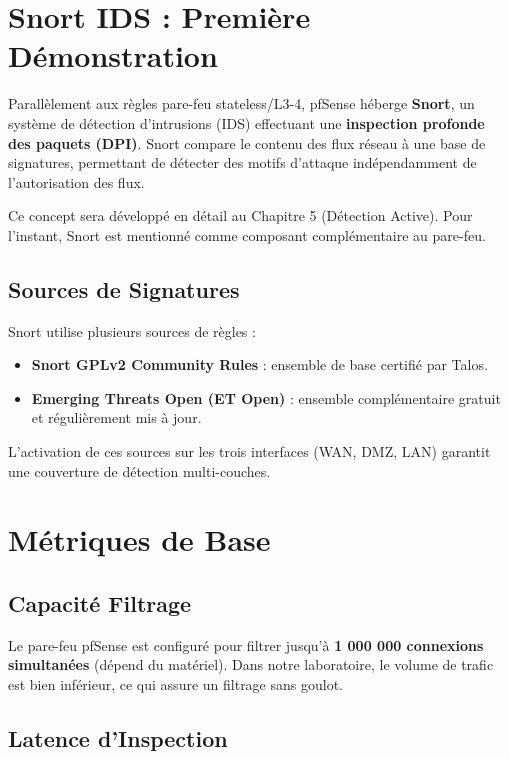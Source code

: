 \documentclass[12pt,a4paper,openany]{report}
\begin{document}
\section{Snort IDS : Première Démonstration}

Parallèlement aux règles pare-feu stateless/L3-4, pfSense héberge \textbf{Snort}, un système de détection d'intrusions (IDS) effectuant une \textbf{inspection profonde des paquets (DPI)}. Snort compare le contenu des flux réseau à une base de signatures, permettant de détecter des motifs d'attaque indépendamment de l'autorisation des flux.

Ce concept sera développé en détail au Chapitre 5 (Détection Active). Pour l'instant, Snort est mentionné comme composant complémentaire au pare-feu.

\subsection{Sources de Signatures}

Snort utilise plusieurs sources de règles :

\begin{itemize}
	\item \textbf{Snort GPLv2 Community Rules} : ensemble de base certifié par Talos.
	\item \textbf{Emerging Threats Open (ET Open)} : ensemble complémentaire gratuit et régulièrement mis à jour.
\end{itemize}

L'activation de ces sources sur les trois interfaces (WAN, DMZ, LAN) garantit une couverture de détection multi-couches.

\section{Métriques de Base}

\subsection{Capacité Filtrage}

Le pare-feu pfSense est configuré pour filtrer jusqu'à \textbf{1 000 000 connexions simultanées} (dépend du matériel). Dans notre laboratoire, le volume de trafic est bien inférieur, ce qui assure un filtrage sans goulot.

\subsection{Latence d'Inspection}
\end{document}
